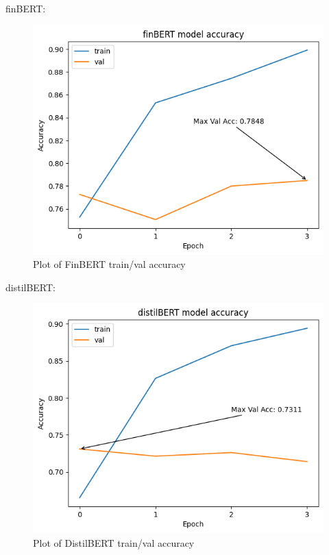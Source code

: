 \newline
\newpage
finBERT:
\begin{figure}[!ht]
    \centering
    \includegraphics[width=12cm]{./images/acc_finBERT_2.png}
    \caption{Plot of FinBERT train/val accuracy}
\end{figure}
\newline
distilBERT:
\begin{figure}[!ht]
    \centering
    \includegraphics[width=12cm]{./images/acc_distilBERT_2.png}
    \caption{Plot of DistilBERT train/val accuracy}
\end{figure}

\newpage

